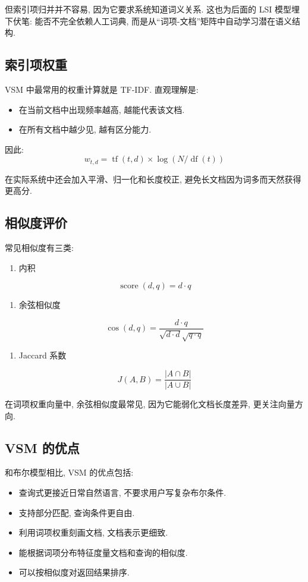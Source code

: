 但索引项归并并不容易, 因为它要求系统知道词义关系.
这也为后面的 LSI 模型埋下伏笔:
能否不完全依赖人工词典, 而是从“词项-文档”矩阵中自动学习潜在语义结构.

\subsection{索引项权重}


VSM 中最常用的权重计算就是 TF-IDF.
直观理解是:

\begin{itemize}
\item 在当前文档中出现频率越高, 越能代表该文档.
\item 在所有文档中越少见, 越有区分能力.
\end{itemize}

因此:
\[
w_{t,d} = \operatorname{tf}(t,d) \times \log(N / \operatorname{df}(t))
\]

在实际系统中还会加入平滑、归一化和长度校正,
避免长文档因为词多而天然获得更高分.

\subsection{相似度评价}


常见相似度有三类:

\begin{enumerate}
\item[1.] 内积
\end{enumerate}
\[
\operatorname{score}(d, q) = d \cdot q
\]

\begin{enumerate}
\item[2.] 余弦相似度
\end{enumerate}
\[
\operatorname{cos}(d, q)
  = \frac{d \cdot q}{\sqrt{d \cdot d}\sqrt{q \cdot q}}
\]

\begin{enumerate}
\item[3.] Jaccard 系数
\end{enumerate}
\[
J(A, B) = \frac{|A \cap B|}{|A \cup B|}
\]

在词项权重向量中, 余弦相似度最常见,
因为它能弱化文档长度差异, 更关注向量方向.

\subsection{VSM 的优点}


和布尔模型相比, VSM 的优点包括:

\begin{itemize}
\item 查询式更接近日常自然语言, 不要求用户写复杂布尔条件.
\item 支持部分匹配, 查询条件更自由.
\item 利用词项权重刻画文档, 文档表示更细致.
\item 能根据词项分布特征度量文档和查询的相似度.
\item 可以按相似度对返回结果排序.
\end{itemize}


